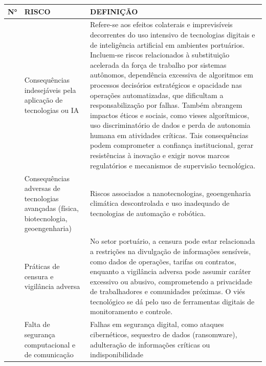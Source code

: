 \documentclass[
  portuguese,
  letterpaper,
  DIV=11,
  numbers=noendperiod]{scrreprt}
\begin{document}
\begin{longtable}[]{@{}
  >{\raggedright\arraybackslash}p{}
  >{\raggedright\arraybackslash}p{}
  >{\raggedright\arraybackslash}p{}@{}}
\toprule\noalign{}
\begin{minipage}[b]{\linewidth}\raggedright
N°
\end{minipage} & \begin{minipage}[b]{\linewidth}\raggedright
RISCO
\end{minipage} & \begin{minipage}[b]{\linewidth}\raggedright
DEFINIÇÃO
\end{minipage} \\
\midrule\noalign{}
\endhead
\bottomrule\noalign{}
\endlastfoot
1 & Consequências indesejáveis pela aplicação de tecnologias ou IA &
Refere-se aos efeitos colaterais e imprevisíveis decorrentes do uso
intensivo de tecnologias digitais e de inteligência artificial em
ambientes portuários. Incluem-se riscos relacionados à substituição
acelerada da força de trabalho por sistemas autônomos, dependência
excessiva de algoritmos em processos decisórios estratégicos e opacidade
nas operações automatizadas, que dificultam a responsabilização por
falhas. Também abrangem impactos éticos e sociais, como vieses
algorítmicos, uso discriminatório de dados e perda de autonomia humana
em atividades críticas. Tais consequências podem comprometer a confiança
institucional, gerar resistências à inovação e exigir novos marcos
regulatórios e mecanismos de supervisão tecnológica. \\
2 & Consequências adversas de tecnologias avançadas (física,
biotecnologia, geoengenharia) & Riscos associados a nanotecnologias,
geoengenharia climática descontrolada e uso inadequado de tecnologias de
automação e robótica. \\
3 & Práticas de censura e vigilância adversa & No setor portuário, a
censura pode estar relacionada a restrições na divulgação de informações
sensíveis, como dados de operações, tarifas ou contratos, enquanto a
vigilância adversa pode assumir caráter excessivo ou abusivo,
comprometendo a privacidade de trabalhadores e comunidades próximas. O
viés tecnológico se dá pelo uso de ferramentas digitais de monitoramento
e controle. \\
4 & Falta de segurança computacional e de comunicação & Falhas em
segurança digital, como ataques cibernéticos, sequestro de dados
(ransomware), adulteração de informações críticas ou indisponibilidade

\end{longtable}
\end{document}
